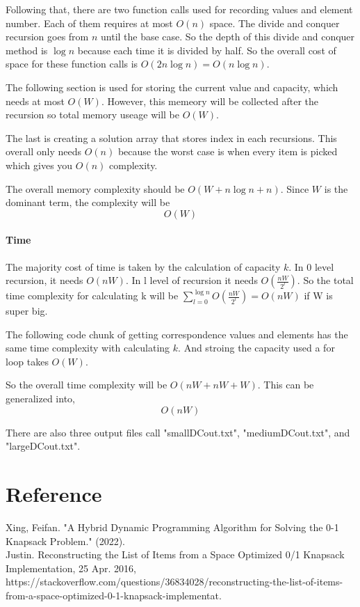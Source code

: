 \documentclass{article}
\begin{document}
Following that, there are two function calls used for recording values and element number. Each of them requires 
at most $O(n)$ space. The divide and conquer recursion goes from $n$ until the base case. So the depth of this divide
and conquer method is $\log n$ because each time it is divided by half.
So the overall cost of space for these function calls is $O(2n \log n) = O(n \log n)$.

The following section is used for storing the current value and capacity, which needs at most 
$O(W)$. However, this memeory will be collected after the recursion so total memory useage will be $O(W)$.

The last is creating a solution array that stores index in each recursions. This overall only needs $O(n)$
because the worst case is when every item is picked which gives you $O(n)$ complexity.

The overall memory complexity should be $O(W + n\log n + n)$. Since $W$ is the dominant term, the complexity will be 
$$O(W)$$

\paragraph{Time}
The majority cost of time is taken by the calculation of capacity $k$. In 0 level recursion, it needs $O(nW)$. In l level
of recursion it needs $O(\frac{nW}{2^l})$. So the total time complexity for calculating k will be $\sum^{\log n}_{l = 0}O(\frac{nW}{2^l}) = O(nW)$ if W is super big.

The following code chunk of getting correspondence values and elements has the same time complexity with calculating $k$. And stroing the capacity
used a for loop takes $O(W)$.

So the overall time complexity will be $O(nW + nW + W)$. This can be generalized into,
$$O(nW)$$

There are also three output files call "smallDCout.txt", "mediumDCout.txt", and "largeDCout.txt".

\pagebreak

\section*{Reference}
Xing, Feifan. "A Hybrid Dynamic Programming Algorithm for Solving the 0-1 Knapsack Problem." (2022).
\\
Justin. Reconstructing the List of Items from a Space Optimized 0/1 Knapsack Implementation, 25 Apr. 2016, https://stackoverflow.com/questions/36834028/reconstructing-the-list-of-items-from-a-space-optimized-0-1-knapsack-implementat. 
\end{document}
